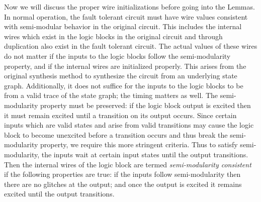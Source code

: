\documentclass[12pt]{report}
\begin{document}
Now we will discuss the proper wire initializations before going into the Lemmas.  In normal operation, the fault tolerant circuit must have wire values consistent with semi-modular behavior in the original circuit.  
This includes the internal wires which exist in the logic blocks in the original circuit and through duplication also exist in the fault tolerant circuit.  The actual values of these wires do not matter if the inputs to the logic blocks follow the semi-modularity property, and if the internal wires are initialized properly.  This arises from the original synthesis method to synthesize the circuit from an underlying state graph.  
Additionally, it does not suffice for the inputs to the logic blocks to be from a valid trace of the state graph; the timing matters as well.  The semi-modularity property must be preserved:  if the logic block output is excited then it must remain excited until a transition on its output occurs.  Since certain inputs which are valid states and arise from valid transitions may cause the logic block to become unexcited before a transition occurs and thus break the semi-modularity property, we require this more stringent criteria.  %
Thus to satisfy semi-modularity, the inputs wait at certain input states until the output transitions.  Then the internal wires of the logic block are termed {\em semi-modularity consistent} if the following properties are true:  if the inputs follow semi-modularity then there are no glitches at the output; and once the output is excited it remains excited until the output transitions. \\%
\end{document}
